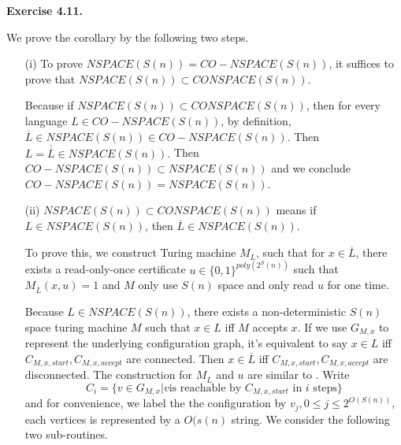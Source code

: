 \documentclass[a4paper]{article}
\newenvironment{exercise}[1]{
	\par
	\noindent\textbf{Exercise #1.}\quad
}{
	\par
	\bigskip
}
\begin{document}
\begin{exercise}{4.11}
We prove the corollary by the following two steps.
\begin{itemize}
\item[(i)] To prove $NSPACE(S(n))=CO-NSPACE(S(n))$, it suffices to prove that $NSPACE(S(n))\subset CONSPACE(S(n))$.

 Because  if $NSPACE(S(n))\subset CONSPACE(S(n))$, then for every language $L\in CO-NSPACE(S(n))$, by definition, $\overline{L}\in NSPACE(S(n))\in CO-NSPACE(S(n))$.  Then $L=\overline{\overline{L}}\in NSPACE(S(n)).$ Then $CO-NSPACE(S(n))\subset NSPACE(S(n))$ and we conclude $CO-NSPACE(S(n))=NSPACE(S(n))$.

\item[(ii)]
$NSPACE(S(n))\subset CONSPACE(S(n))$ means if $L\in NSPACE(S(n))$, then $\overline{L}\in NSPACE(S(n))$. 

To prove this, we construct Turing machine $M_{\overline{L}}$, such that for $x\in \overline{L}$, there exists a read-only-once certificate $u\in \{0,1\}^{poly(2^S(n))}$ such that $M_{\overline{L}}(x,u)=1$ and $M$ only use $S(n)$ space and only read $u$ for one time.

Because $L\in NSPACE(S(n))$, there exists a non-deterministic $S(n)$ space turing machine $M$ such that $x\in L$ iff $M$ accepts $x$. If we use $G_{M,x}$ to represent the underlying configuration graph, it's equivalent to say $x\in L$ iff $C_{M,x,start}, C_{M,x,accept}$ are connected. Then $x\in\overline{L}$ iff $C_{M,x,start}, C_{M,x,accept}$ are disconnected. The construction for $M_{\overline{L}}$ and $u$ are similar to . Write
$$
C_i=\{ v\in G_{M,x}| v \text{is reachable by $C_{M,x,start}$ in $i$ steps} \}
$$ and for convenience, we label the the configuration by $v_j, 0\leq j\leq 2^{O(S(n))}$, each vertices is represented by a $O(s(n)$ string. We consider the following two sub-routines.


\end{itemize}
\end{exercise}
\end{document}
